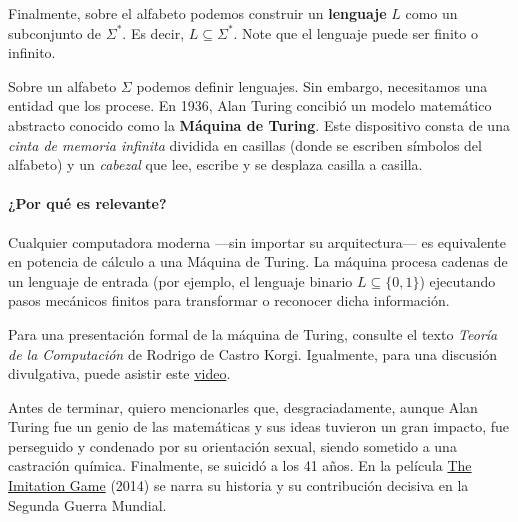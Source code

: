 \documentclass[12pt]{article}
\begin{document}
Finalmente, sobre el alfabeto podemos construir un \textbf{lenguaje} $L$
como un subconjunto de $\Sigma^*$. Es decir, $L\subseteq \Sigma^*$.
Note que el lenguaje puede ser finito o infinito. 

\begin{cajaflex}
Sobre un alfabeto $\Sigma$ podemos definir lenguajes. Sin embargo, necesitamos una entidad que los procese. 
En 1936, Alan Turing concibió un modelo matemático abstracto conocido como la 
\textbf{Máquina de Turing}. Este dispositivo consta de una \textit{cinta de memoria infinita} 
dividida en casillas (donde se escriben símbolos del alfabeto) y un \textit{cabezal} que lee, 
escribe y se desplaza casilla a casilla. 
\paragraph{¿Por qué es relevante?}
Cualquier computadora moderna —sin importar su arquitectura— es equivalente en 
potencia de cálculo a una Máquina de Turing. La máquina procesa cadenas de un lenguaje 
de entrada (por ejemplo, el lenguaje binario $L \subseteq \{0, 1\}$) ejecutando pasos
mecánicos finitos para transformar o reconocer dicha información.

\vspace{0.1cm}
Para una presentación formal de la máquina de Turing, 
consulte el texto \textit{Teoría de la Computación} de Rodrigo de Castro Korgi. 
Igualmente, para una discusión divulgativa, puede asistir este \href{https://www.youtube.com/watch?v=iaXLDz_UeYY}{video}.

\vspace{0.1cm}
Antes de terminar, quiero mencionarles que, desgraciadamente, aunque Alan Turing fue un genio de 
las matemáticas y sus ideas tuvieron un gran impacto, fue perseguido y condenado por su orientación sexual, 
siendo sometido a una castración química. Finalmente, se suicidó a los 41 años. 
En la película \href{https://www.imdb.com/title/tt2084970/}{The Imitation Game} (2014) 
se narra su historia y su contribución decisiva en la Segunda Guerra Mundial.
\end{cajaflex}
\end{document}
